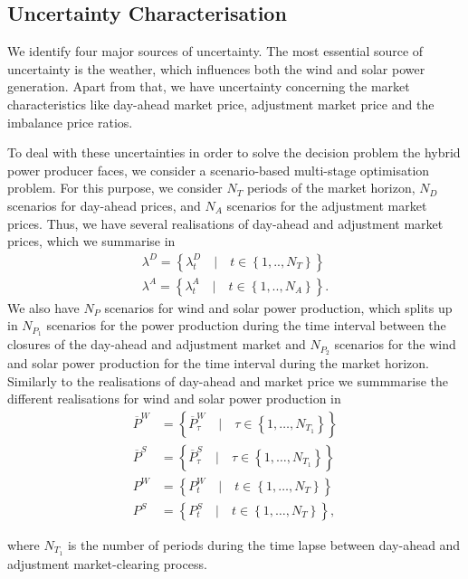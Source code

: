 \subsection{Uncertainty Characterisation}\label{sub:Uncertainty_Characterization}

We identify four major sources of uncertainty. The most essential source of uncertainty is the weather, which influences both the wind and solar power generation. Apart from that, we have uncertainty concerning the market characteristics like day-ahead market price, adjustment market price and the imbalance price ratios.

To deal with these uncertainties in order to solve the decision problem the hybrid power producer faces, we consider a scenario-based multi-stage optimisation problem. 
For this purpose, we consider $N_{T}$ periods of the market horizon, $N_{D}$ scenarios for day-ahead prices, and $N_{A}$ scenarios for the adjustment market prices. Thus, we have several realisations of day-ahead and adjustment market prices, which we summarise in
\begin{align*}
	\lambda^{D}=\left\{\lambda_{t}^{D} \quad \lvert \quad t \in \left\{1, .., N_{T}\right\}\right\}
	\\ \lambda^{A}=\left\{\lambda_{t}^{A}\quad \lvert \quad t \in \left\{1, .., N_{A}\right\}\right\}.
\end{align*}
We also have $N_P$ scenarios for wind and solar power production, which splits up in $N_{P_1}$ scenarios for the power production during the time interval between the closures of the day-ahead and adjustment market and $N_{P_2}$ scenarios for the wind and solar power production for the time interval during the market horizon. Similarly to the realisations of day-ahead and market price we summmarise the different realisations for wind and solar power production in 
\begin{align*}
\overline{P}^{W} &=\left\{\overline{P}_{\tau}^{W} \quad \lvert \quad \tau \in \left\{1, \dots, N_{T_1}\right\}\right\} \\
\overline{P}^S &=\left\{\overline{P}_{\tau}^{S} \quad \lvert \quad \tau \in \left\{1, \dots, N_{T_1}\right\}\right\} \\
P^W &= \left\{P_{t}^{W} \quad \lvert \quad t \in \left\{1, \dots, N_T\right\}\right\} \\
P^S &= \left\{P_{t}^{S} \quad \lvert \quad t \in \left\{1, \dots, N_T\right\}\right\}, 
\end{align*}

where $N_{T_1} $ is the number of periods during the time lapse between day-ahead and adjustment market-clearing process.


